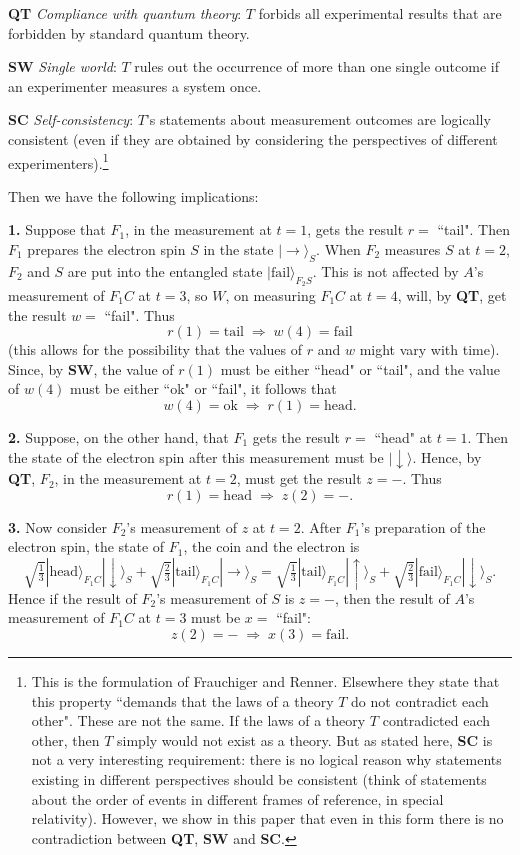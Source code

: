 \documentclass[12pt,reqno]{article}
\newcommand{\head}{\text{head}}
\newcommand{\tail}{\text{tail}}
\newcommand{\ok}{\text{ok}}
\newcommand{\fail}{\text{fail}}
\newcommand{\be}{\begin{equation}}
\newcommand{\ee}{\end{equation}}
\renewcommand{\(}{\left(}
\renewcommand{\)}{\right)}
\renewcommand{\.}{\centerdot}
\newcommand{\1}{\mathbf{1}}
\newcommand{\<}{\langle}
\renewcommand{\>}{\rangle}
\newcommand{\third}{\tfrac{1}{3}}
\theoremstyle{definition}
\theoremstyle{remark}
\numberwithin{equation}{section}
\begin{document}
{\bf QT} \emph{Compliance with quantum theory}: $T$ forbids all experimental results that are forbidden by standard quantum theory.

{\bf SW} \emph{Single world}: $T$ rules out the occurrence of more than one single outcome if an experimenter measures a system once.

{\bf SC} \emph{Self-consistency}: $T$'s statements about measurement outcomes are logically consistent (even if they are obtained by considering the perspectives of different experimenters).\footnote{This is the formulation of Frauchiger and Renner. Elsewhere they state that this property ``demands that the laws of a theory $T$ do not contradict each other". These are not the same. If the laws of a theory $T$ contradicted each other, then $T$ simply would not exist as a theory. But as stated here, {\bf SC} is not a very interesting requirement: there is no logical reason why statements existing in different perspectives should be consistent (think of statements about the order of events in different frames of reference, in special relativity). However, we show in this paper that even in this form there is no contradiction between {\bf QT}, {\bf SW} and {\bf SC}.}

Then we have the following implications:

{\bf 1.} Suppose that $F_1$, in the measurement at $t = 1$, gets the result $r =$ ``tail". Then $F_1$ prepares the electron spin $S$ in the state $|\rightarrow\>_S$. When $F_2$ measures $S$ at $t = 2$, $F_2$ and $S$ are put into the entangled state $|\fail\>_{F_2S}$. This is not affected by $A$'s measurement of $F_1C$ at $t = 3$, so $W$, on measuring $F_1C$ at $t = 4$, will, by {\bf QT}, get the result $w =$ ``fail". Thus
\be\label{r implies w}
r(1) = \tail\; \Longrightarrow \; w(4) = \fail 
\ee
(this allows for the possibility that the values of $r$ and $w$ might vary with time). Since, by {\bf SW}, the value of $r(1)$ must be either ``head" or ``tail",  and the value of $w(4)$ must be either ``ok" or ``fail", it follows that 
\be\label{w implies r}
w(4) = \ok \; \Longrightarrow \; r(1) = \head.
\ee

{\bf 2.} Suppose, on the other hand, that $F_1$ gets the result $r =$ ``head" at $t = 1$. Then the state of the electron spin after this measurement must be $|\downarrow\>$. Hence, by {\bf QT}, $F_2$, in the measurement at $t = 2$, must get the result $z = -$. Thus
\be\label{r implies z}
r(1) = \head \; \Longrightarrow \; z(2) = -.
\ee

{\bf 3.} Now consider $F_2$'s measurement of $z$ at $t = 2$. After $F_1$'s preparation of the electron spin, the state of $F_1$, the coin and the electron is
\[
\sqrt{\third}|\head\>_{F_1C}|\downarrow\>_S + \sqrt{\tfrac{2}{3}}|\tail\>_{F_1C}|\rightarrow\>_S = \sqrt{\third}|\tail\>_{F_1C}|\uparrow\>_S + \sqrt{\tfrac{2}{3}}|\fail\>_{F_1C}|\downarrow\>_S.
\]
Hence if the result of $F_2$'s measurement of $S$ is $z = -$, then the result of $A$'s measurement of $F_1C$ at $t = 3$ must be $x =$ ``fail":
\be\label{z implies x}
z(2) = - \; \Longrightarrow \; x(3) = \fail.
\ee
\end{document}

